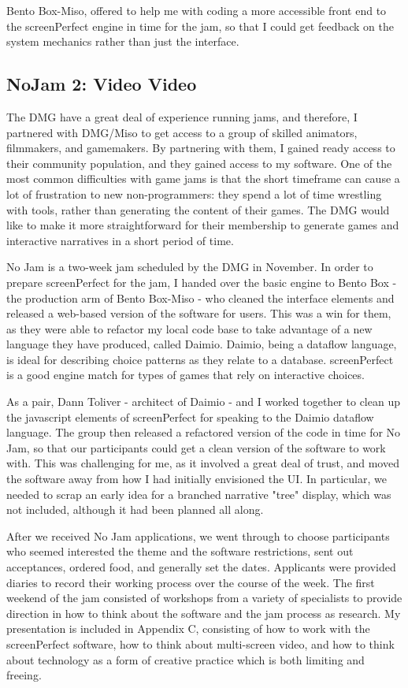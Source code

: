 Bento Box-Miso, offered to help me with coding a more accessible front end to the screenPerfect engine in time for the jam, so that I could get feedback on the system mechanics rather than just the interface.


\subsection{NoJam 2: Video Video}

The DMG have a great deal of experience running jams, and therefore, I partnered with DMG/Miso to get access to a group of skilled animators, filmmakers, and gamemakers. By partnering with them, I gained ready access to their community population, and they gained access to my software. One of the most common difficulties with game jams is that the short timeframe can cause a lot of frustration to new non-programmers: they spend a lot of time wrestling with tools, rather than generating the content of their games. The DMG would like to make it more straightforward for their membership to generate games and interactive narratives in a short period of time. 

No Jam is a two-week jam scheduled by the DMG in November. In order to prepare screenPerfect for the jam, I handed over the basic engine to Bento Box - the production arm of Bento Box-Miso - who cleaned the interface elements and released a web-based version of the software for users. This was a win for them, as they were able to refactor my local code base to take advantage of a new language they have produced, called Daimio. Daimio, being a dataflow language, is ideal for describing choice patterns as they relate to a database. screenPerfect is a good engine match for types of games that rely on interactive choices. 

As a pair, Dann Toliver - architect of Daimio - and I worked together to clean up the javascript elements of screenPerfect for speaking to the Daimio dataflow language. The group then released a refactored version of the code in time for No Jam, so that our participants could get a clean version of the software to work with. This was challenging for me, as it involved a great deal of trust, and moved the software away from how I had initially envisioned the UI. In particular, we needed to scrap an early idea for a branched narrative "tree" display, which was not included, although it had been planned all along.

After we received No Jam applications, we went through to choose participants who seemed interested the theme and the software restrictions, sent out acceptances, ordered food, and generally set the dates. Applicants were provided diaries to record their working process over the course of the week. The first weekend of the jam consisted of workshops from a variety of specialists to provide direction in how to think about the software and the jam process as research. My presentation is included in Appendix C, consisting of how to work with the screenPerfect software, how to think about multi-screen video, and how to think about technology as a form of creative practice which is both limiting and freeing. 

